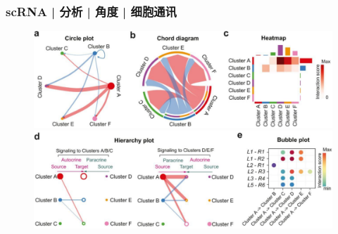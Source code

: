 \documentclass[11pt]{ctexbeamer}
\begin{document}
\begin{frame}
	\frametitle{scRNA | 分析 | 角度 | 细胞通讯}
	\begin{figure}
		\includegraphics[width=\textwidth]{scRNA_cellchat_01.png}\\
		\vspace{0.5em}
		\includegraphics[width=\textwidth]{scRNA_cellchat_02.png}
	\end{figure}
\end{frame}
\end{document}
